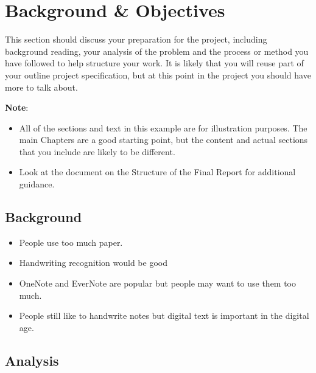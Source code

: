 \chapter{Background \& Objectives}

This section should discuss your preparation for the project, including background reading, your analysis of the problem and the process or method you have followed to help structure your work.  It is likely that you will reuse part of your outline project specification, but at this point in the project you should have more to talk about.

\textbf{Note}:

\begin{itemize}
   \item All of the sections and text in this example are for illustration purposes. The main Chapters are a good starting point, but the content and actual sections that you include are likely to be different.

   \item Look at the document on the Structure of the Final Report for additional guidance.

\end {itemize}

\section{Background}
\begin{itemize}
  \item People use too much paper.
  \item Handwriting recognition would be good
  \item OneNote and EverNote are popular but people may want to use them too much.
  \item People still like to handwrite notes but digital text is important in the digital age.
\end{itemize}

\section{Analysis}

